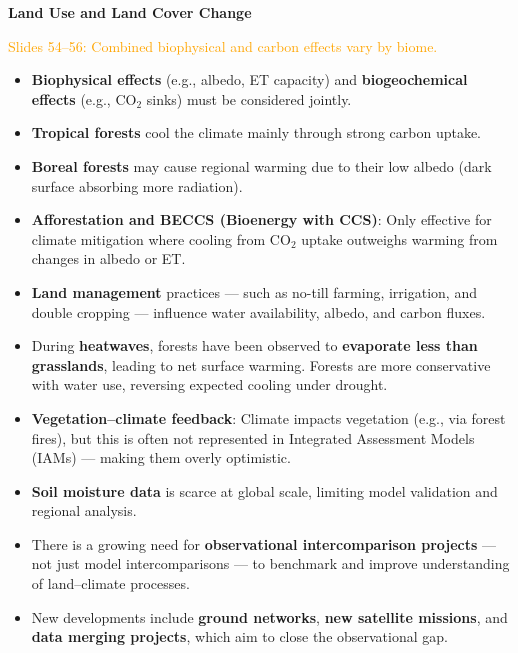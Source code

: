 \documentclass[fontsize=8pt, a4paper, landscape, fleqn]{scrartcl}
\renewcommand{\subsection}[1]{%
    \noindent\colorbox{subsectioncolor}{%
        \parbox{\dimexpr\columnwidth-2\fboxsep}{\color{white}\textbf{#1}}}%
    \vspace{0.5mm}%
}
\begin{document}
\begin{multicols*}{3}[\raggedcolumns]
\subsection{Land Use and Land Cover Change}
\noindent \textcolor{orange}{Slides 54–56: Combined biophysical and carbon effects vary by biome.}

\begin{itemize}
    \item \textbf{Biophysical effects} (e.g., albedo, ET capacity) and \textbf{biogeochemical effects} (e.g., CO$_2$ sinks) must be considered jointly.
    \item \textbf{Tropical forests} cool the climate mainly through strong carbon uptake.
    \item \textbf{Boreal forests} may cause regional warming due to their low albedo (dark surface absorbing more radiation).
    \item \textbf{Afforestation and BECCS (Bioenergy with CCS)}: Only effective for climate mitigation where cooling from CO$_2$ uptake outweighs warming from changes in albedo or ET.
    \item \textbf{Land management} practices — such as no-till farming, irrigation, and double cropping — influence water availability, albedo, and carbon fluxes.
    \item During \textbf{heatwaves}, forests have been observed to \textbf{evaporate less than grasslands}, leading to net surface warming. Forests are more conservative with water use, reversing expected cooling under drought.
    \item \textbf{Vegetation–climate feedback}: Climate impacts vegetation (e.g., via forest fires), but this is often not represented in Integrated Assessment Models (IAMs) — making them overly optimistic.
    \item \textbf{Soil moisture data} is scarce at global scale, limiting model validation and regional analysis.
    \item There is a growing need for \textbf{observational intercomparison projects} — not just model intercomparisons — to benchmark and improve understanding of land–climate processes.
    \item New developments include \textbf{ground networks}, \textbf{new satellite missions}, and \textbf{data merging projects}, which aim to close the observational gap.
\end{itemize}


\end{multicols*}
\end{document}

